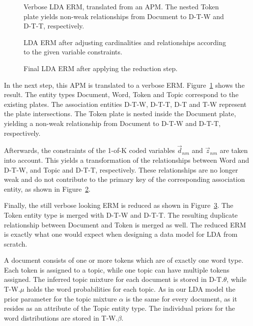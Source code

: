 \begin{figure}[p]
\centering
\scalebox{0.5}{\adjustTikzSize }
\caption[Verbose LDA ERM, translated from an APM]{Verbose LDA ERM, translated from an APM. The nested Token plate yields non-weak relationships from Document to D-T-W and D-T-T, respectively.}\label{fig:topic_erm_good_verbose}
\end{figure}

\begin{figure}[p]
\centering
\scalebox{0.5}{\adjustTikzSize }
\caption[LDA ERM after taking constraints into account]{LDA ERM after adjusting cardinalities and relationships according to the given variable constraints.}\label{fig:topic_erm_good_constraints}
\end{figure}

\begin{figure}[p]
\centering
\scalebox{0.5}{\adjustTikzSize }
\caption[Final LDA ERM after applying the reduction step]{Final LDA ERM after applying the reduction step.}\label{fig:topic_erm_good_reduced}
\end{figure}

In the next step, this APM is translated to a verbose ERM. Figure~\ref{fig:topic_erm_good_verbose} shows the result. The entity types Document, Word, Token and Topic correspond to the existing plates. The association entities D-T-W, D-T-T, D-T and T-W represent the plate intersections. The Token plate is nested inside the Document plate, yielding a non-weak relationship from Document to D-T-W and D-T-T, respectively.

Afterwards, the constraints of the 1-of-K coded variables $\vec d_{nm}$ and $\vec z_{nm}$ are taken into account. This yields a transformation of the relationships between Word and D-T-W, and Topic and D-T-T, respectively. These relationships are no longer weak and do not contribute to the primary key of the corresponding association entity, as shown in Figure~\ref{fig:topic_erm_good_constraints}.

Finally, the still verbose looking ERM is reduced as shown in Figure~\ref{fig:topic_erm_good_reduced}. The Token entity type is merged with D-T-W and D-T-T. The resulting duplicate relationship between Document and Token is merged as well. The reduced ERM is exactly what one would expect when designing a data model for LDA from scratch.

A document consists of one or more tokens which are of exactly one word type. Each token is assigned to a topic, while one topic can have multiple tokens assigned. The inferred topic mixture for each document is stored in D-T.$\theta$, while T-W.$\mu$ holds the word probabilities for each topic. As in our LDA model the prior parameter for the topic mixture $\alpha$ is the same for every document, as it resides as an attribute of the Topic entity type. The individual priors for the word distributions are stored in T-W.$\beta$.

